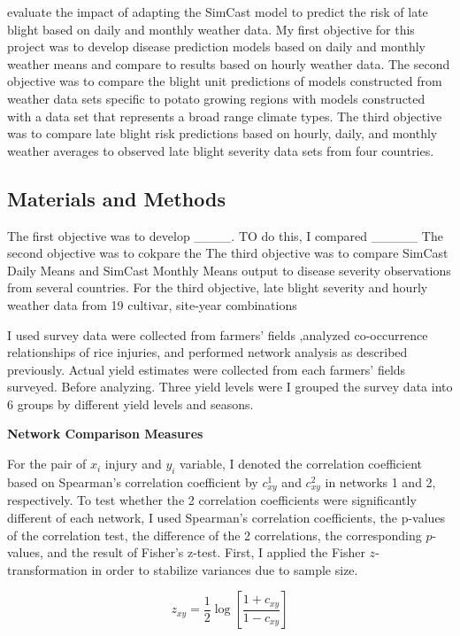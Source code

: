 evaluate the impact of adapting the SimCast model to predict the risk of late blight based on daily and monthly weather data. My first objective for this project was to develop disease prediction models based on daily and monthly weather means and compare to results based on hourly weather data. The second objective was to compare the blight unit predictions of models constructed from weather data sets specific to potato growing regions with models constructed with a data set that represents a broad range climate types. The third objective was to compare late blight risk predictions based on hourly, daily, and monthly weather averages to observed late blight severity data sets from four countries. 

\subsection{Materials and Methods}

The first objective was to develop ____. TO do this, I compared _____
The second objective was to cokpare the 
The third objective was to compare SimCast Daily Means and SimCast Monthly Means output to disease severity observations from several countries. For the third objective, late blight severity and hourly weather data from 19 cultivar, site-year combinations 

I used survey data were collected from farmers' fields ,analyzed co-occurrence relationships of rice injuries, and performed network analysis as described previously. Actual yield estimates were collected from each farmers' fields surveyed. Before analyzing. Three yield levels were  I grouped the survey data into 6 groups by different yield levels and seasons.

\textbf{Network Comparison Measures}

For the pair of $x_{i}$ injury and $y_{i}$ variable, I denoted the correlation coefficient based on Spearman's correlation coefficient by $c_{xy}^1$ and $c_{xy}^2$ in networks 1 and 2, respectively. To test whether the 2 correlation coefficients were significantly different of each network, I used Spearman's correlation coefficients, the p-values of the correlation test, the difference of the 2 correlations, the corresponding $p$-values, and the result of Fisher's z-test. First, I applied the Fisher $z$-transformation in order to stabilize variances due to sample size.

\begin{equation}
z_{xy} = \frac{1}{2} \log\left[{\frac{1 + c_{xy}}{1 - c_{xy}}}\right]
\end{equation}

